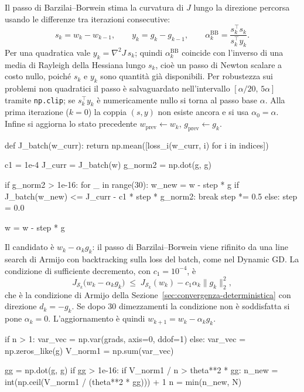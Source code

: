 \documentclass[italian, a4paper, twoside, binding=6mm]{sapthesis}
\begin{document}
Il passo di Barzilai--Borwein stima la curvatura di $J$ lungo la direzione
percorsa usando le differenze tra iterazioni consecutive:
\[
s_k = w_k - w_{k-1}, \qquad y_k = g_k - g_{k-1}, \qquad
\alpha_k^{\mathrm{BB}} = \frac{s_k^{\top} s_k}{s_k^{\top} y_k}.
\]
Per una quadratica vale $y_k = \nabla^2 J\, s_k$; quindi
$\alpha_k^{\mathrm{BB}}$ coincide con l'inverso di una media di Rayleigh
della Hessiana lungo $s_k$, cioè un passo di Newton scalare a costo nullo,
poiché $s_k$ e $y_k$ sono quantità già disponibili. Per robustezza sui problemi
non quadratici il passo è salvaguardato nell'intervallo $[\alpha/20,\,5\alpha]$
tramite \texttt{np.clip}; se $s_k^{\top}y_k$ è numericamente nullo si torna al
passo base $\alpha$. Alla prima iterazione ($k=0$) la coppia $(s,y)$ non esiste
ancora e si usa $\alpha_0 = \alpha$. Infine si aggiorna lo stato precedente
$w_{\text{prev}} \leftarrow w_k$, $g_{\text{prev}} \leftarrow g_k$.

\begin{pythoncode}[title= BB-CCV]

        def J_batch(w_curr):
            return np.mean([loss_i(w_curr, i) for i in indices])

        c1 = 1e-4
        J_curr = J_batch(w)
        g_norm2 = np.dot(g, g)

        if g_norm2 > 1e-16:
            for _ in range(30):
                w_new = w - step * g
                if J_batch(w_new) <= J_curr - c1 * step * g_norm2:
                    break
                step *= 0.5
            else:
                step = 0.0

        w = w - step * g
\end{pythoncode}

Il candidato è $w_k - \alpha_k g_k$: il passo di Barzilai--Borwein viene
rifinito da una line search di Armijo con backtracking sulla loss del batch,
come nel Dynamic GD. La condizione di sufficiente decremento, con
$c_1 = 10^{-4}$, è
\[
J_{\mathcal{S}_k}\bigl(w_k - \alpha_k g_k\bigr) \;\le\;
J_{\mathcal{S}_k}(w_k) - c_1 \alpha_k \|g_k\|_2^2,
\]
che è la condizione di Armijo della Sezione~\ref{sec:convergenza-deterministica}
con direzione $d_k = -g_k$. Se dopo 30 dimezzamenti la condizione non è
soddisfatta si pone $\alpha_k = 0$. L'aggiornamento è quindi
$w_{k+1} = w_k - \alpha_k g_k$.

\begin{pythoncode}[title= BB-CCV]

        if n > 1:
            var_vec = np.var(grads, axis=0, ddof=1)
        else:
            var_vec = np.zeros_like(g)
        V_norm1 = np.sum(var_vec)

        gg = np.dot(g, g)
        if gg > 1e-16:
            if V_norm1 / n > theta**2 * gg:
                n_new = int(np.ceil(V_norm1 / (theta**2 * gg))) + 1
                n = min(n_new, N)
\end{pythoncode}
\end{document}
